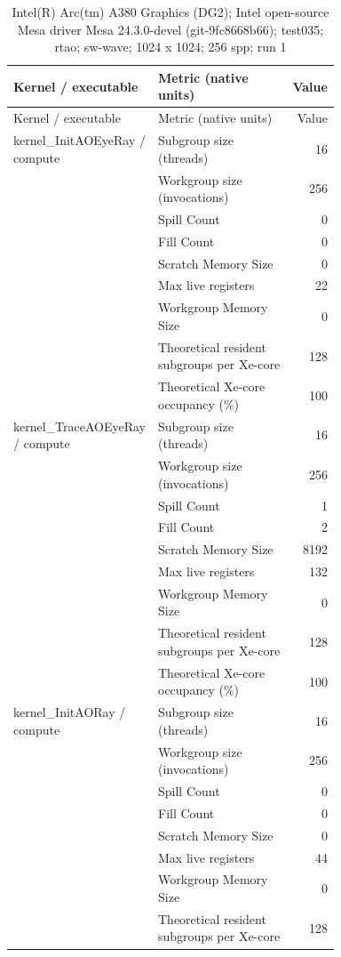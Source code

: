 \begin{longtable}{p{0.30\linewidth}p{0.43\linewidth}r}
\caption{Intel(R) Arc(tm) A380 Graphics (DG2); Intel open-source Mesa driver Mesa 24.3.0-devel (git-9fc8668b66); test035; rtao; sw-wave; 1024 x 1024; 256 spp; run 1}\label{tab:hydra-profile-9}\\
\hline Kernel / executable & Metric (native units) & Value \\\hline
\endfirsthead
\hline Kernel / executable & Metric (native units) & Value \\\hline
\endhead
kernel\_InitAOEyeRay / compute & Subgroup size (threads) & 16 \\
 & Workgroup size (invocations) & 256 \\
 & Spill Count & 0 \\
 & Fill Count & 0 \\
 & Scratch Memory Size & 0 \\
 & Max live registers & 22 \\
 & Workgroup Memory Size & 0 \\
 & Theoretical resident subgroups per Xe-core & 128 \\
 & Theoretical Xe-core occupancy (\%) & 100 \\
\hline
kernel\_TraceAOEyeRay / compute & Subgroup size (threads) & 16 \\
 & Workgroup size (invocations) & 256 \\
 & Spill Count & 1 \\
 & Fill Count & 2 \\
 & Scratch Memory Size & 8192 \\
 & Max live registers & 132 \\
 & Workgroup Memory Size & 0 \\
 & Theoretical resident subgroups per Xe-core & 128 \\
 & Theoretical Xe-core occupancy (\%) & 100 \\
\hline
kernel\_InitAORay / compute & Subgroup size (threads) & 16 \\
 & Workgroup size (invocations) & 256 \\
 & Spill Count & 0 \\
 & Fill Count & 0 \\
 & Scratch Memory Size & 0 \\
 & Max live registers & 44 \\
 & Workgroup Memory Size & 0 \\
 & Theoretical resident subgroups per Xe-core & 128 \\

\end{longtable}
